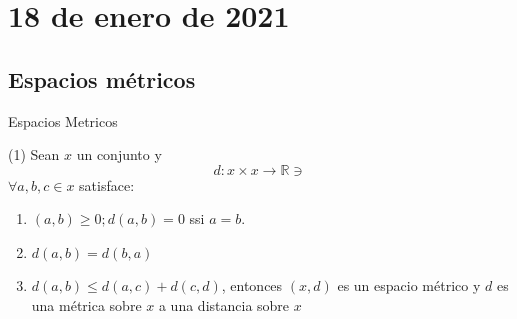 \section{18 de enero de 2021}

\subsection{Espacios métricos}

\begin{definition}
Espacios Metricos

(1) Sean $x$ un conjunto y $$d: x \times x \rightarrow \mathbb{R}\ni$$
$\forall a, b, c \in x$ satisface:
\begin{enumerate}
\item $(a, b) \geqslant 0 ; d(a, b)=0$ ssi $a=b$.
\item $d(a, b)=d(b, a)$
\item $d(a, b) \leqslant d(a, c)+d(c, d)$, entonces $(x, d)$ es un espacio métrico y $d$ es una métrica sobre $x$ a una
distancia sobre $x$
\end{enumerate}


\end{definition}